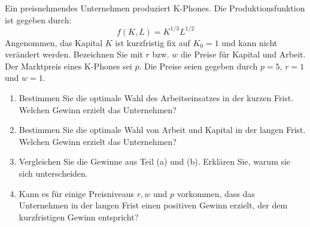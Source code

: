 \begin{question}
	Ein preisnehmendes Unternehmen produziert K-Phones. Die Produktionsfunktion ist gegeben durch:
	\[
		f(K, L) = K^{1/3} L^{1/2}
	\]
	Angenommen, das Kapital \(K\) ist kurzfristig fix auf \(K_0 = 1\) und kann nicht verändert werden. Bezeichnen Sie mit \(r\) bzw. \(w\) die Preise für Kapital und Arbeit. Der Marktpreis eines K-Phones sei \(p\). Die Preise seien gegeben durch \(p = 5\), \(r = 1\) und \(w = 1\).

	\begin{enumerate}
		\item Bestimmen Sie die optimale Wahl des Arbeitseinsatzes in der kurzen Frist. Welchen Gewinn erzielt das Unternehmen?
		\item Bestimmen Sie die optimale Wahl von Arbeit und Kapital in der langen Frist. Welchen Gewinn erzielt das Unternehmen?
		\item Vergleichen Sie die Gewinne aus Teil (a) und (b). Erklären Sie, warum sie sich unterscheiden.
		\item Kann es für einige Preisniveaus \(r, w\) und \(p\) vorkommen, dass das Unternehmen in der langen Frist einen positiven Gewinn erzielt, der dem kurzfristigen Gewinn entspricht?
	\end{enumerate}
\end{question}

